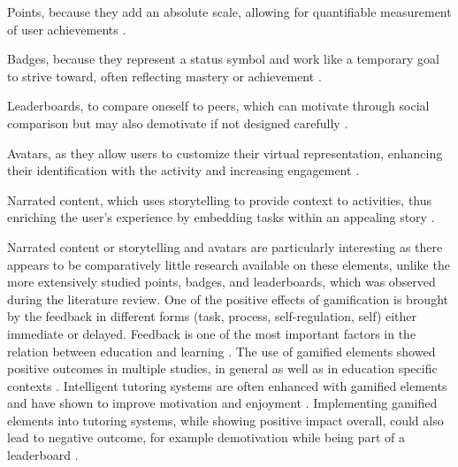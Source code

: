 \begin{APAitemize}
    \item Points, because they add an absolute scale, allowing for quantifiable measurement of user achievements \parencite{hamariDoesGamificationWork2014}.
    \item Badges, because they represent a status symbol and work like a temporary goal to strive toward, often reflecting mastery or achievement \parencite{gonzalezGamificationIntelligentTutoring2014}.
    \item Leaderboards, to compare oneself to peers, which can motivate through social comparison but may also demotivate if not designed carefully \parencite{hamariDoesGamificationWork2014, almeidaSystematicMappingNegative2021}.
    \item Avatars, as they allow users to customize their virtual representation, enhancing their identification with the activity and increasing engagement \parencite{gonzalezGamificationIntelligentTutoring2014}.
    \item Narrated content, which uses storytelling to provide context to activities, thus enriching the user's experience by embedding tasks within an appealing story \parencite{gonzalezGamificationIntelligentTutoring2014}.
\end{APAitemize}
Narrated content or storytelling and avatars are particularly interesting as there appears to be comparatively little research available on these elements, unlike the more extensively studied points, badges, and leaderboards, which was observed during the literature review.
One of the positive effects of gamification is brought by the feedback in different forms (task, process, self-regulation, self) either immediate or delayed.
Feedback is one of the most important factors in the relation between education and learning \parencite{sailerGamificationLearningMetaanalysis2020}.
The use of gamified elements showed positive outcomes in multiple studies, in general \parencite{hamariDoesGamificationWork2014} as well as in education specific contexts \parencite{sailerGamificationLearningMetaanalysis2020}.
Intelligent tutoring systems are often enhanced with gamified elements \parencite{gonzalezGamificationIntelligentTutoring2014} and have shown to improve motivation and enjoyment \parencite{jacksonMotivationPerformanceGamebased2013}.
Implementing gamified elements into tutoring systems, while showing positive impact overall, could also lead to negative outcome, for example demotivation while being part of a leaderboard \parencite{almeidaSystematicMappingNegative2021}.
